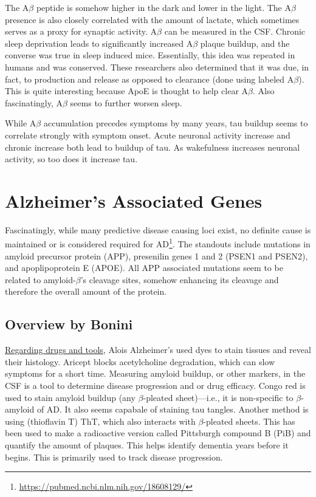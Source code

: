 \documentclass[12pt]{report}
\begin{document}
The A$\beta$ peptide is somehow higher in the dark and lower in the light. The A$\beta$ presence is also closely correlated with the amount of lactate, which sometimes serves as a proxy for synaptic activity. A$\beta$ can be measured in the CSF. Chronic sleep deprivation leads to significantly increased A$\beta$ plaque buildup, and the converse was true in sleep induced mice. Essentially, this idea was repeated in humans and was conserved. These researchers also determined that it was due, in fact, to production and release as opposed to clearance (done using labeled A$\beta$). This is quite interesting because ApoE is thought to help clear A$\beta$. Also fascinatingly, A$\beta$ seems to further worsen sleep.\newline

While A$\beta$ accumulation precedes symptoms by many years, tau buildup seems to correlate strongly with symptom onset. Acute neuronal activity increase and chronic increase both lead to buildup of tau. As wakefulness increases neuronal activity, so too does it increase tau.\newline

\section*{Alzheimer's Associated Genes}

Fascinatingly, while many predictive disease causing loci exist, no definite cause is maintained or is considered required for AD\footnote{\url{https://pubmed.ncbi.nlm.nih.gov/18608129/}}. The standouts include mutations in amyloid precursor protein (APP), presenilin genes 1 and 2 (PSEN1 and PSEN2), and apoplipoprotein E (APOE). All APP associated mutations seem to be related to amyloid-$\beta$'s cleavage sites, somehow enhancing its cleavage and therefore the overall amount of the protein.\newline

\subsection*{Overview by Bonini}

\underline{Regarding drugs and tools}, Alois Alzheimer's used dyes to stain tissues and reveal their histology. Aricept blocks acetylcholine degradation, which can slow symptoms for a short time. Measuring amyloid buildup, or other markers, in the CSF is a tool to determine disease progression and or drug efficacy. Congo red is used to stain amyloid buildup (any $\beta$-pleated sheet)---i.e., it is non-specific to $\beta$-amyloid of AD. It also seems capabale of staining tau tangles. Another method is using (thioflavin T) ThT, which also interacts with $\beta$-pleated sheets. This has been used to make a radioactive version called Pittsburgh compound B (PiB) and quantify the amount of plaques. This helps identify dementia years before it begins. This is primarily used to track disease progression.\newline
\end{document}
